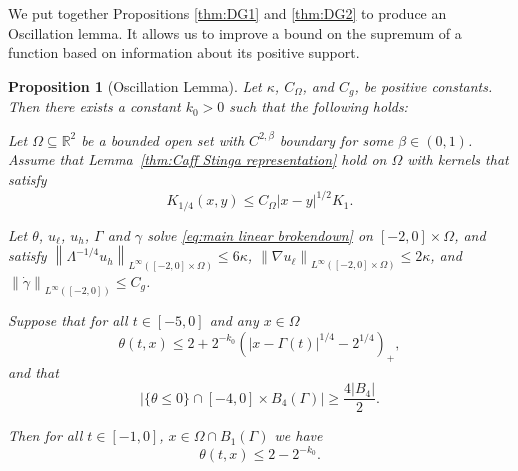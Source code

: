 \documentclass[11pt]{amsart}
\newtheorem{proposition}[theorem]{Proposition}
\theoremstyle{remark}
\theoremstyle{definition}
\newcommand{\R}{\mathbb{R}}
\newcommand{\norm}[1]{\left\lVert#1\right\rVert}
\newcommand{\paren}[1]{\left( #1 \right)}
\newcommand{\abs}[1]{\left\lvert #1 \right\rvert}
\newcommand{\grad}{\nabla}
\newcommand{\ulow}{u_\ell}
\newcommand{\uhigh}{u_h}
\newcommand{\Cgamma}{C_g}
\newcommand{\Comega}{C_\Omega}
\begin{document}
We put together Propositions \ref{thm:DG1} and \ref{thm:DG2} to produce an Oscillation lemma.  It allows us to improve a bound on the supremum of a function based on information about its positive support.  

\begin{proposition}[Oscillation Lemma] \label{thm:oscillation general}
Let $\kappa$, $\Comega$, and $\Cgamma$, be positive constants. Then there exists a constant $k_0>0$ such that the following holds:

Let $\Omega \subseteq \R^2$ be a bounded open set with $C^{2,\beta}$ boundary for some $\beta \in (0,1)$.  Assume that Lemma~\ref{thm:Caff Stinga representation} hold on $\Omega$ with kernels that satisfy
\[ K_{1/4}(x,y) \leq \Comega |x-y|^{1/2} K_{1}. \]

Let $\theta$, $\ulow$, $\uhigh$, $\Gamma$ and $\gamma$ solve \eqref{eq:main linear brokendown} on $[-2,0]\times\Omega$, and satisfy $\norm{\Lambda^{-1/4} \uhigh}_{L^\infty([-2,0]\times\Omega)} \leq 6 \kappa$, $\norm{\grad \ulow}_{L^\infty([-2,0]\times\Omega)} \leq 2\kappa$, and $\norm{\dot{\gamma}}_{L^\infty([-2,0])} \leq \Cgamma$.  


Suppose that for all $t \in [-5,0]$ and any $x \in \Omega$
\begin{equation} \label{oscillation boundedness} \theta(t,x) \leq 2 + 2^{-k_0} \paren{|x-\Gamma(t)|^{1/4}-2^{1/4}}_+, \end{equation}
and that
\[ \abs{\{\theta \leq 0\} \cap [-4,0]\times B_4(\Gamma)} \geq \frac{4|B_4|}{2}. \]

Then for all $t \in [-1,0]$, $x \in \Omega \cap B_1(\Gamma)$ we have
\[ \theta(t,x) \leq 2 - 2^{-k_0}. \]
\end{proposition}
\end{document}
